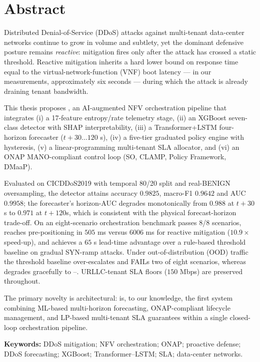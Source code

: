 \chapter*{Abstract}

Distributed Denial-of-Service (DDoS) attacks against multi-tenant data-center
networks continue to grow in volume and subtlety, yet the dominant defensive
posture remains \emph{reactive}: mitigation fires only after the attack
has crossed a static threshold. Reactive mitigation inherits a hard lower
bound on response time equal to the virtual-network-function (VNF) boot
latency --- in our measurements, approximately six seconds --- during which
the attack is already draining tenant bandwidth.

This thesis proposes \padonap{}, an AI-augmented NFV orchestration pipeline
that integrates (i) a 17-feature entropy/rate telemetry stage, (ii) an XGBoost
seven-class detector with SHAP interpretability, (iii) a
Transformer+LSTM four-horizon forecaster (\(t{+}30{\dots}120\) s), (iv) a
five-tier graduated policy engine with hysteresis, (v) a linear-programming
multi-tenant SLA allocator, and (vi) an ONAP MANO-compliant control loop
(SO, CLAMP, Policy Framework, DMaaP).

Evaluated on CICDDoS2019 with temporal 80/20 split and real-BENIGN
oversampling, the detector attains accuracy \(0.9825\), macro-F1 \(0.9642\)
and AUC \(0.9958\); the forecaster's horizon-AUC degrades
monotonically from \(0.988\) at \(t{+}30\)s to \(0.971\) at \(t{+}120\)s,
which is consistent with the physical forecast-horizon trade-off.
On an eight-scenario orchestration benchmark \padonap{} passes 8/8 scenarios,
reaches  pre-positioning in \(505\) ms versus \(6006\) ms for
 reactive mitigation (\(10.9\times\) speed-up), and achieves a
\(65\) s lead-time advantage over a rule-based threshold baseline on
gradual SYN-ramp attacks. Under out-of-distribution (OOD) traffic the
threshold baseline over-escalates and FAILs two of eight scenarios, whereas
\padonap{} degrades gracefully to --. URLLC-tenant SLA floors
(\(150\) Mbps) are preserved throughout.

The primary novelty is architectural: \padonap{} is, to our knowledge, the
first system combining ML-based multi-horizon forecasting, ONAP-compliant
lifecycle management, and LP-based multi-tenant SLA guarantees within a
single closed-loop orchestration pipeline.

\vspace{1em}
\noindent\textbf{Keywords:} DDoS mitigation; NFV orchestration; ONAP;
proactive defense; DDoS forecasting; XGBoost; Transformer--LSTM; SLA;
data-center networks.

